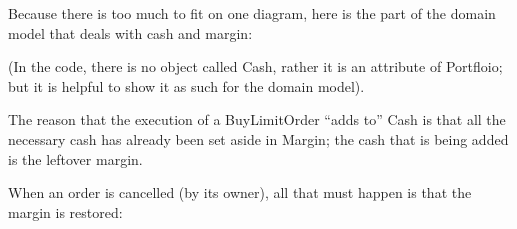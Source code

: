 \documentclass[a4]{article}
\begin{document}
Because there is too much to fit on one diagram, here is the part of the domain
model that deals with cash and margin:
\begin{figure}
\noindent{}
\end{figure}

(In the code, there is no object called Cash, rather it is an attribute of
Portfloio; but it is helpful to show it as such for the domain model).

The reason that the execution of a BuyLimitOrder ``adds to'' Cash is that all the
necessary cash has already been set aside in Margin; the cash that is being
added is the leftover margin.

When an order is cancelled (by its owner), all that must happen is that the
margin is restored:
\begin{figure}
\noindent{}
\end{figure}
\end{document}
